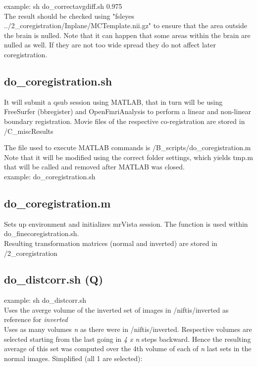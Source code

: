 \documentclass[12pt,a4paper]{scrartcl}
\begin{document}
\noindent example: sh do\_correctavgdiff.sh 0.975\\

\noindent The result should be checked using "fsleyes ../2\_coregistration/Inplane/MCTemplate.nii.gz" to ensure that the area outside the brain is nulled. Note that it can happen that some areas within the brain are nulled as well. If they are not too wide spread they do not affect later coregistration.

\subsection{do\_coregistration.sh}
It will submit a qsub session using MATLAB, that in turn will be using FreeSurfer (bbregister) and OpenFmriAnalysis to perform a linear and non-linear boundary registration.  Movie files of the respective co-registration are stored in /C\_miscResults

\noindent The file used to execute MATLAB commands is /B\_scripts/do\_coregistration.m Note that it will be modified using the correct folder settings, which yields tmp.m that will be called and removed after MATLAB was closed.\\

example: do\_coregistration.sh

\subsection{do\_coregistration.m}
Sets up environment and initializes mrVista session. The function is used within do\_finecoregistration.sh.\\

Resulting transformation matrices (normal and inverted) are stored in /2\_coregistration\\

\subsection{do\_distcorr.sh (Q)}
example: sh do\_distcorr.sh\\

\noindent Uses the averge volume of the inverted set of images in /niftis/inverted as reference for \textit{inverted}\\

\noindent Uses as many volumes \textit{n} as there were in /niftis/inverted. Respective volumes are selected starting from the last going in \textit{4 x n} steps backward. Hence the resulting average of this set was computed over the 4th volume of each of \textit{n} last sets in the normal images. Simplified (all 1 are selected):\\
\end{document}
